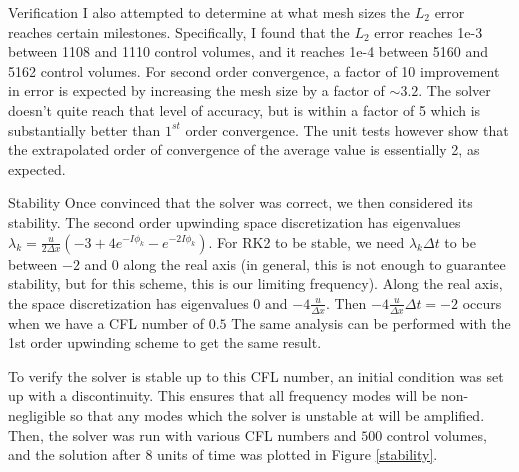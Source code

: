 \documentclass{article}
\begin{document}
\begin{section}{Verification}
I also attempted to determine at what mesh sizes the $L_2$ error reaches certain milestones.
Specifically, I found that the $L_2$ error reaches 1e-3 between 1108 and 1110 control volumes,
and it reaches 1e-4 between 5160 and 5162 control volumes.
For second order convergence, a factor of 10 improvement in error is expected by increasing
the mesh size by a factor of $\sim 3.2$.
The solver doesn't quite reach that level of accuracy,
but is within a factor of 5 which is substantially better than $1^{st}$ order convergence.
The unit tests however show that the extrapolated order of convergence of the average value
is essentially 2, as expected.
\end{section}

\begin{section}{Stability}
Once convinced that the solver was correct, we then considered its stability.
The second order upwinding space discretization has eigenvalues
$\lambda_k = \frac{u}{2 \Delta x} (-3 + 4 e^{-I \phi_k} - e^{-2 I \phi_k})$.
For RK2 to be stable, we need $\lambda_k \Delta t$ to be between $-2$ and $0$ along the real axis
(in general, this is not enough to guarantee stability,
but for this scheme, this is our limiting frequency).
Along the real axis, the space discretization has eigenvalues $0$ and $-4 \frac{u}{\Delta x}$.
Then $-4 \frac{u}{\Delta x}\Delta t = -2$ occurs when we have a CFL number of $0.5$
The same analysis can be performed with the 1st order upwinding scheme to get the same result.

To verify the solver is stable up to this CFL number,
an initial condition was set up with a discontinuity.
This ensures that all frequency modes will be non-negligible so that any modes which the solver
is unstable at will be amplified.
Then, the solver was run with various CFL numbers and $500$ control volumes,
and the solution after 8 units of time was plotted in Figure \ref{stability}.


\end{section}
\end{document}
